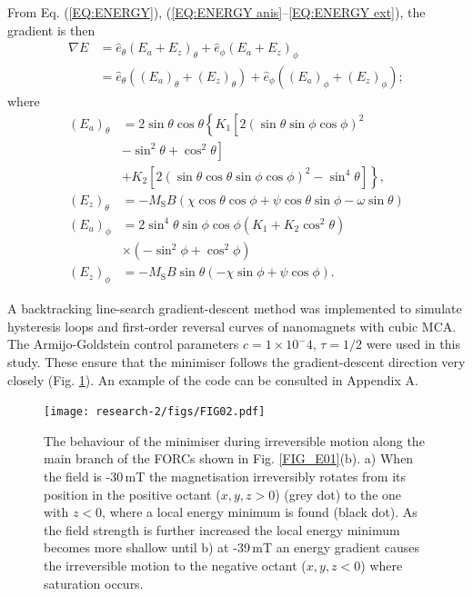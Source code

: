 From Eq. (\ref{EQ:ENERGY}), (\ref{EQ:ENERGY anis}--\ref{EQ:ENERGY ext}), the gradient is then
\begin{align}
  \nabla E &= \hat{e}_\theta \left( E_a + E_z \right)_\theta + \hat{e}_\phi \left( E_a + E_z \right)_\phi  \nonumber \\
           &= \hat{e}_\theta \left( (E_a)_\theta + (E_z)_\theta \right) + \hat{e}_\phi \left( (E_a)_\phi + (E_z)_\phi \right);
\end{align}
where
\begin{align}
( E_a )_\theta &= 2\sin\theta\cos\theta\left\{ K_1  \left[ 2\left( \sin\theta\sin\phi\cos\phi \right)^2 \right. \right. \nonumber \\
             &- \left. \sin^2 \theta + \cos^2 \theta \right] \nonumber \\
             &+ \left. K_2 \left[ 2( \sin\theta\cos\theta\sin\phi\cos\phi )^2 - \sin^4\theta \right] \right\}, \\
( E_z )_\theta &= - M_\text{S} B ( \chi\cos\theta\cos\phi + \psi\cos\theta\sin\phi - \omega\sin\theta ) \\
( E_a )_\phi &= 2\sin^4\theta\sin\phi\cos\phi \left( K_1+K_2\cos^2\theta\right) \nonumber \\
            &\times \left( - \sin^2\phi + \cos^2\phi \right) \\
( E_z )_\phi &= -M_\text{S} B\sin\theta \left( - \chi\sin\phi + \psi\cos\phi \right).
\end{align}
\par
A backtracking line-search gradient-descent method \citep{Armijo1966} was implemented to simulate hysteresis loops and first-order reversal curves of nanomagnets with cubic MCA. The Armijo-Goldstein control parameters $c=1\times10^-4$, $\tau=1/2$ were used in this study. These ensure that the minimiser follows the gradient-descent direction very closely (Fig. \ref{FIG_E02}). An example of the code can be consulted in Appendix A.
\begin{figure}
\texttt{[image: research-2/figs/FIG02.pdf]}
\caption[The behaviour of the minimiser during irreversible motion]{The behaviour of the minimiser during irreversible motion along the main branch of the FORCs shown in Fig. \ref{FIG_E01}(b). a) When the field is -30$\,$mT the magnetisation irreversibly rotates from its position in the positive octant ($x,y,z>0$) (grey dot) to the one with $z<0$, where a local energy minimum is found (black dot). As the field strength is further increased the local energy minimum becomes more shallow until b) at -39$\,$mT an energy gradient causes the irreversible motion to the negative octant ($x,y,z<0$) where saturation occurs.}
\label{FIG_E02}
\end{figure}
\par

